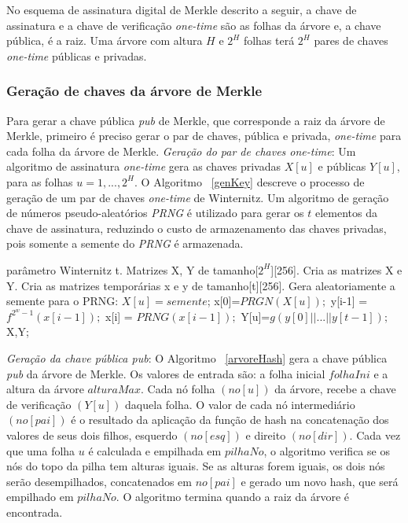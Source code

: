 \documentclass{SBCbookchapter}
\begin{document}
\begin{otherlanguage}{brazilian}
No esquema de assinatura digital de Merkle descrito a seguir, a chave de assinatura e a chave de verificação \textit{one-time} são as folhas da árvore e, a chave pública, é a raiz. 
Uma árvore com altura $H$ e $2^H$ folhas terá $2^H$ pares de chaves \textit{one-time} públicas e privadas.

\subsubsection{Geração de chaves da árvore de Merkle}

Para gerar a chave pública \textit{pub} de Merkle, que corresponde a raiz da árvore de Merkle, primeiro é preciso gerar o par de chaves, pública e privada, \textit{one-time} para cada folha da árvore de Merkle.
\newline \newline \textit{Geração do par de chaves {one-time}}: Um algoritmo de assinatura \textit{one-time} gera as chaves privadas $X[u]$ e públicas $Y[u]$, para as folhas $u=1,...,2^H$.
O Algoritmo ~\ref{genKey} descreve o processo de ge\-ração de um par de chaves \textit{one-time} de Winternitz. 
Um algoritmo de geração de números pseudo-aleatórios \textit{PRNG} é utilizado para gerar os $t$ elementos da chave de assinatura, reduzindo o custo de armazenamento das chaves privadas, pois somente a semente do \textit{PRNG} é armazenada.

\begin{algorithm}
\caption{Geração do par de chaves \textit{one-time} de Winternitz~\cite{merkle:79}}
\begin{algorithmic}
\Require parâmetro Winternitz t.
\Ensure Matrizes X, Y de tamanho[$2^H$][256].
\State Cria as matrizes X e Y.
\State Cria as matrizes temporárias x e y de tamanho[t][256].
	\State Gera aleatoriamente a semente para o PRNG: $X[u]=semente$;
	\State x[0]=$PRGN(X[u]);$
	    \State y[i-1] = $f^{2^{w}-1}(x[i-1]);$		
	    \State x[i] = $PRNG(x[i-1]);$
	\EndFor
	\State Y[u]=$g(y[0]|| ...|| y[t-1]);$
	\State \Return X,Y;
\EndFor
\end{algorithmic}
\label{genKey}
\end{algorithm} 

\noindent \textit{Geração da chave pública pub}: O Algoritmo ~\ref{arvoreHash} gera a chave pública \textit{pub} da árvore de Merkle. 
Os valores de entrada são: a folha inicial $folhaIni$ e a altura da árvore $alturaMax$.
Cada nó folha $(no[u])$ da árvore, recebe a chave de verificação $(Y[u])$ daquela folha. 
O valor de cada nó intermediário $(no[pai])$ é o resultado da aplicação da função de hash na concatenação dos valores de seus dois filhos, esquerdo $(no[esq])$ e direito $(no[dir])$. 
Cada vez que uma folha $u$ é calculada e empilhada em $pilhaNo$, o algoritmo verifica se os nós do topo da pilha tem alturas iguais. 
Se as alturas forem iguais, os dois nós serão desempilhados, concatenados em $no[pai]$ e gerado um novo hash, que será empilhado em $pilhaNo$. 
O algoritmo termina quando a raiz da árvore é encontrada.


\end{otherlanguage}
\end{document}
